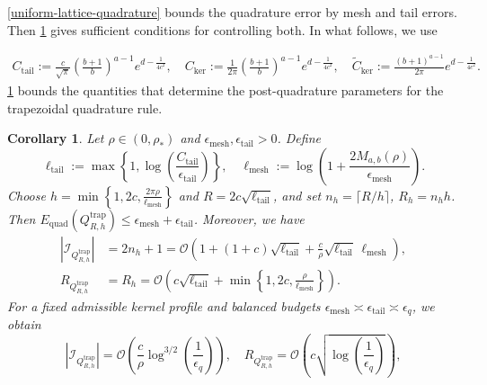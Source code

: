 \documentclass[10pt,reqno]{article}
\numberwithin{equation}{section}
\theoremstyle{plain}
\newtheorem{cor}[thm]{Corollary}
\theoremstyle{definition}
\begin{document}
\cref{uniform-lattice-quadrature} bounds the quadrature error by mesh and tail errors. Then \cref{trap-budget} gives sufficient conditions for controlling both. In what follows, we use

\begin{align}
C_{\operatorname{tail}} := \frac{c}{\sqrt{\pi}}\left(\frac{b+1}{b}\right)^{a-1}e^{d-\frac{1}{4c^2}}, \quad
C_{\operatorname{ker}} := \frac{1}{2\pi}\left(\frac{b+1}{b}\right)^{a-1}e^{d-\frac{1}{4c^2}}, \quad
\widetilde C_{\operatorname{ker}} := \frac{(b+1)^{a-1}}{2\pi}e^{d-\frac{1}{4c^2}}.
\end{align}
\cref{trap-budget} bounds the quantities that determine the post-quadrature parameters for the trapezoidal quadrature rule.

\begin{cor}\label{trap-budget}
Let \(\rho\in(0,\rho_\ast)\) and \(\epsilon_{\operatorname{mesh}},\epsilon_{\operatorname{tail}}>0\). Define
\begin{equation}\label{eq:tail-log-def}
\ell_{\operatorname{tail}} := \max\left\{1,\log\left(\frac{C_{\operatorname{tail}}}{\epsilon_{\operatorname{tail}}}\right)\right\}, \quad \ell_{\operatorname{mesh}} := \log\left(1+\frac{2M_{a,b}(\rho)}{\epsilon_{\operatorname{mesh}}}\right).
\end{equation}
Choose \(h=\min\left\{1,2c,\frac{2\pi\rho}{\ell_{\operatorname{mesh}}}\right\}\) and \(R=2c\sqrt{\ell_{\operatorname{tail}}}\), and set \(n_h=\lceil R/h\rceil\), \(R_h=n_hh\). Then $E_{\operatorname{quad}}(Q_{R,h}^{\operatorname{trap}})\le \epsilon_{\operatorname{mesh}}+\epsilon_{\operatorname{tail}}$. Moreover, we have
\begin{align}
|\mathcal I_{Q_{R,h}^{\operatorname{trap}}}| &= 2n_h+1 = \mathcal O\left(1+(1+c)\sqrt{\ell_{\operatorname{tail}}}+\frac{c}{\rho}\sqrt{\ell_{\operatorname{tail}}}\,\ell_{\operatorname{mesh}}\right), \label{eq:trap-comparison-cardinality-1}\\
R_{Q_{R,h}^{\operatorname{trap}}} &= R_h = \mathcal O\left(c\sqrt{\ell_{\operatorname{tail}}}+\min\left\{1,2c,\frac{\rho}{\ell_{\operatorname{mesh}}}\right\}\right). \label{eq:trap-comparison-cardinality-2}
\end{align}
For a fixed admissible kernel profile and balanced budgets \(\epsilon_{\operatorname{mesh}}\asymp\epsilon_{\operatorname{tail}}\asymp\epsilon_q\), we obtain
\begin{equation}\label{eq:trap-balanced-cardinality}
|\mathcal I_{Q_{R,h}^{\operatorname{trap}}}| = \mathcal O\left(\frac{c}{\rho}\log^{3/2}\left(\frac1{\epsilon_q}\right)\right), \quad R_{Q_{R,h}^{\operatorname{trap}}} = \mathcal O\left(c\sqrt{\log\left(\frac1{\epsilon_q}\right)}\right),

\end{equation}
\end{cor}
\end{document}
